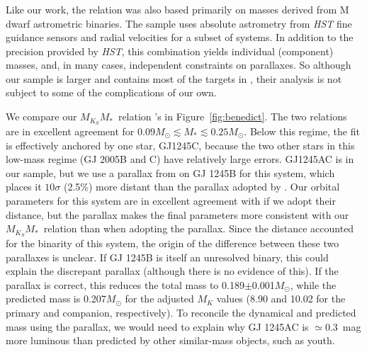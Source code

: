 \documentclass[twocolumn]{aastex62}
\newcommand{\mmk}{$M_{K_S}$\textendash$M_*$}
\begin{document}
\subsubsection{\citet{Benedict2016}}
Like our work, the \citet{Benedict2016} relation was also based primarily on masses derived from M dwarf astrometric binaries. The \citet{Benedict2016} sample uses absolute astrometry from {\it HST} fine guidance sensors and radial velocities for a subset of systems. In addition to the precision provided by {\it HST}, this combination yields individual (component) masses, and, in many cases, independent constraints on parallaxes. So although our sample is larger and contains most of the targets in \citet{Benedict2016}, their analysis is not subject to some of the complications of our own. 

We compare our \mmk\ relation \citet{Benedict2016}'s in Figure~\ref{fig:benedict}. The two relations are in excellent agreement for $0.09M_\odot\lesssim M_* \lesssim 0.25M_\odot$. Below this regime, the \citet{Benedict2016} fit is effectively anchored by one star, GJ1245C, because the two other stars in this low-mass regime (GJ 2005B and C) have relatively large errors. GJ1245AC is in our sample, but we use a parallax from \citet{GaiaDr2} on GJ 1245B for this system, which places it $10\sigma$ (2.5\%) more distant than the parallax adopted by \citet{Benedict2016}. Our orbital parameters for this system are in excellent agreement with \citet{Benedict2016} if we adopt their distance, but the \citet{GaiaDr2} parallax makes the final parameters more consistent with our \mmk\ relation than when adopting the \citet{Benedict2016} parallax. Since the \citet{Benedict2016} distance accounted for the binarity of this system, the origin of the difference between these two parallaxes is unclear. If GJ 1245B is itself an unresolved binary, this could explain the discrepant parallax (although there is no evidence of this). If the \citet{Benedict2016} parallax is correct, this reduces the total mass to 0.189$\pm$0.001$M_\odot$, while the predicted mass is 0.207$M_\odot$ for the adjusted $M_K$ values (8.90 and 10.02 for the primary and companion, respectively). To reconcile the dynamical and predicted mass using the \citet{Benedict2016} parallax, we would need to explain why GJ 1245AC is $\simeq$0.3~mag more luminous than predicted by other similar-mass objects, such as youth.
\end{document}
